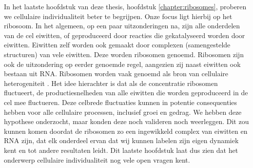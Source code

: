 In het laatste hoofdstuk van deze thesis, hoofdstuk \ref{chapter:ribosomes}, proberen we cellulaire individualiteit beter te begrijpen.
%
Onze focus ligt hierbij op het ribosoom.
%
In het algemeen, op een paar uitzonderingen na, zijn alle onderdelen van de cel eiwitten, of geproduceerd door reacties die gekatalyseerd worden door eiwitten. 
Eiwitten zelf worden ook gemaakt door complexen (samengestelde structuren) van vele eiwitten. Deze worden ribosomen genoemd.
%
Ribosomen zijn ook de uitzondering op eerder genoemde regel, aangezien zij naast eiwitten ook bestaan uit RNA.
%
Ribosomen worden vaak genoemd als bron van cellulaire heterogeniteit \cite{Davidson2008, Raj2008, Chalancon2012, Bruggeman2018}. 
%
Het idee hierachter is dat als de concentratie ribosomen fluctueert, de productiesnelheden van alle eiwitten die worden geproduceerd in de cel mee fluctueren. 
%
Deze celbrede fluctuaties kunnen in potentie consequenties hebben voor alle cellulaire processen, 
inclusief groei en gedrag.
%
We hebben deze hypothese onderzocht, maar konden deze noch valideren noch weerleggen.
%
Dit zou kunnen komen doordat de ribosomen zo een ingewikkeld complex van eiwitten en RNA zijn, 
dat elk onderdeel ervan dat wij kunnen labelen zijn eigen dynamiek kent en tot andere resultaten leidt. 
%
Dit laatste hoofdstuk laat dus zien dat het onderwerp cellulaire individualiteit nog vele open vragen kent.






































